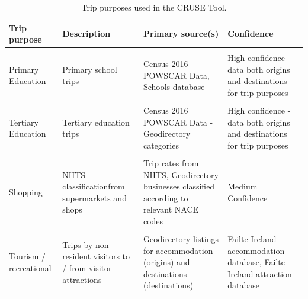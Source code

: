 \documentclass[
  super,
  preprint,
  3p]{elsarticle}
\begin{document}
\begin{longtable}[t]{>{\raggedright\arraybackslash}p{5em}>{\raggedright\arraybackslash}p{12em}>{\raggedright\arraybackslash}p{15em}>{\raggedright\arraybackslash}p{15em}}

\caption{\label{tbl-trip-purposes}Trip purposes used in the CRUSE Tool.}

\tabularnewline

\toprule
Trip purpose & Description & Primary source(s) & Confidence\\
\midrule
\cellcolor{gray!10}{Work (commute)} & \cellcolor{gray!10}{Commuting to / from workplaces} & \cellcolor{gray!10}{Census 2016 POWSCAR Data} & \cellcolor{gray!10}{High confidence - data both origins and destinations for trip purposes}\\
Primary Education & Primary school trips & Census 2016 POWSCAR Data, Schools database & High confidence - data both origins and destinations for trip purposes\\
\cellcolor{gray!10}{Secondary Education} & \cellcolor{gray!10}{Secondary school trips} & \cellcolor{gray!10}{Census 2016 POWSCAR Data, Schools database} & \cellcolor{gray!10}{High confidence - data both origins and destinations for trip purposes}\\
Tertiary Education & Tertiary education trips & Census 2016 POWSCAR Data - Geodirectory categories & High confidence - data both origins and destinations for trip purposes\\
\cellcolor{gray!10}{Social} & \cellcolor{gray!10}{NHTS classification (e.g. restaurants, cinemas, gyms etc.)} & \cellcolor{gray!10}{Trip rates from NHTS, Geodirectory businesses classified according to relevant NACE codes} & \cellcolor{gray!10}{Medium Confidence}\\
\addlinespace
Shopping & NHTS classificationfrom supermarkets and shops & Trip rates from NHTS, Geodirectory businesses classified according to relevant NACE codes & Medium Confidence\\
\cellcolor{gray!10}{Personal / other} & \cellcolor{gray!10}{Combination of two NHTS classifications, and includes trips to medical, personal services and others} & \cellcolor{gray!10}{Trip rates from NHTS, Geodirectory businesses classified according to relevant NACE codes} & \cellcolor{gray!10}{Medium Confidence}\\
Tourism / recreational & Trips by non-resident visitors to / from visitor attractions & Geodirectory listings for accommodation (origins) and destinations (destinations) & Failte Ireland accommodation database, Failte Ireland attraction database\\
\bottomrule

\end{longtable}
\end{document}
